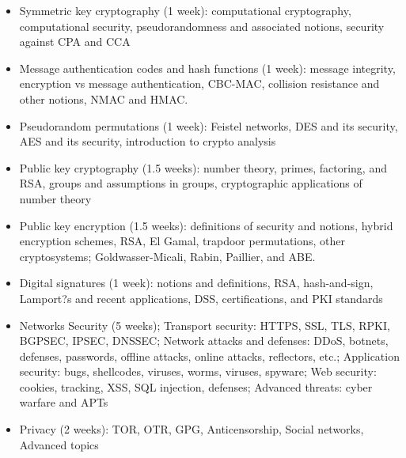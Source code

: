 \documentclass[11pt]{article}
\begin{document}
\begin{itemize} 
\item Symmetric key cryptography (1 week): computational cryptography, computational security, pseudorandomness and associated notions, security against CPA and CCA
\item Message authentication codes and hash functions (1 week): message integrity, encryption vs message authentication, CBC-MAC, collision resistance and other notions, NMAC and HMAC.
\item Pseudorandom permutations (1 week): Feistel networks, DES and its security, AES and its security, introduction to crypto analysis
\item Public key cryptography (1.5 weeks): number theory, primes, factoring, and RSA, groups and assumptions in groups, cryptographic applications of number theory
\item Public key encryption (1.5 weeks): definitions of security and notions, hybrid encryption schemes, RSA, El Gamal, trapdoor permutations, other cryptosystems; Goldwasser-Micali, Rabin, Paillier, and ABE.
\item Digital signatures (1 week): notions and definitions, RSA, hash-and-sign, Lamport?s and recent applications, DSS, certifications, and PKI standards
\end{itemize}

\begin{itemize}
\item Networks Security (5 weeks); Transport security: HTTPS, SSL, TLS, RPKI, BGPSEC, IPSEC, DNSSEC; Network attacks and defenses: DDoS, botnets, defenses, passwords, offline attacks, online attacks, reflectors, etc.; Application security: bugs, shellcodes, viruses, worms, viruses,
spyware; Web security: cookies, tracking, XSS, SQL injection, defenses; Advanced threats: cyber warfare and APTs
\item Privacy (2 weeks): TOR, OTR, GPG, Anticensorship, Social networks, Advanced topics
\end{itemize}
\end{document}
